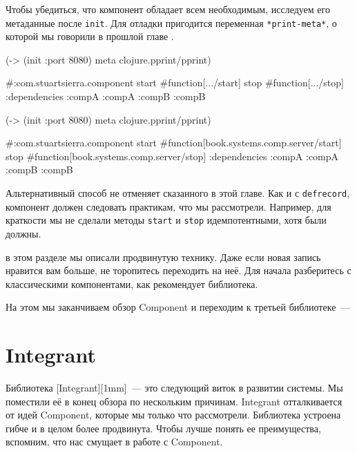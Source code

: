 \fi

Чтобы убедиться, что компонент обладает всем необходимым, исследуем его
метаданные после \verb|init|. Для отладки пригодится переменная
\verb|*print-meta*|, о которой мы говорили в прошлой главе .

\ifnarrow

\begin{english}
  \begin{clojure}
(-> (init {:port 8080})
    meta
    clojure.pprint/pprint)

#:com.stuartsierra.component
 {start #function[.../start]
  stop  #function[.../stop]
  :dependencies
  {:compA :compA :compB :compB}}
  \end{clojure}
\end{english}

\else

\begin{english}
  \begin{clojure}
(-> (init {:port 8080})
    meta
    clojure.pprint/pprint)

#:com.stuartsierra.component
  {start #function[book.systems.comp.server/start]
   stop #function[book.systems.comp.server/stop]
   :dependencies {:compA :compA :compB :compB}}
  \end{clojure}
\end{english}

\fi


Альтернативный способ не отменяет сказанного в этой главе. Как и с
\verb|defrecord|, компонент должен следовать практикам, что мы
рассмотрели. Например, для краткости мы не сделали методы \verb|start| и
\verb|stop| идемпотентными, хотя были должны.

в этом разделе мы описали продвинутую технику. Даже если новая запись нравится
вам больше, не торопитесь переходить на неё. Для начала разберитесь с
классическими компонентами, как рекомендует библиотека.

На этом мы заканчиваем обзор Component и переходим к третьей библиотеке~---

\section{Integrant}


Библиотека [Integrant][1mm]~--- это
следующий виток в развитии системы. Мы поместили её в конец обзора по нескольким
причинам. Integrant отталкивается от идей Component, которые мы только что
рассмотрели. Библиотека устроена гибче и в целом более продвинута. Чтобы лучше
понять ее преимущества, вспомним, что нас смущает в работе с Component.

